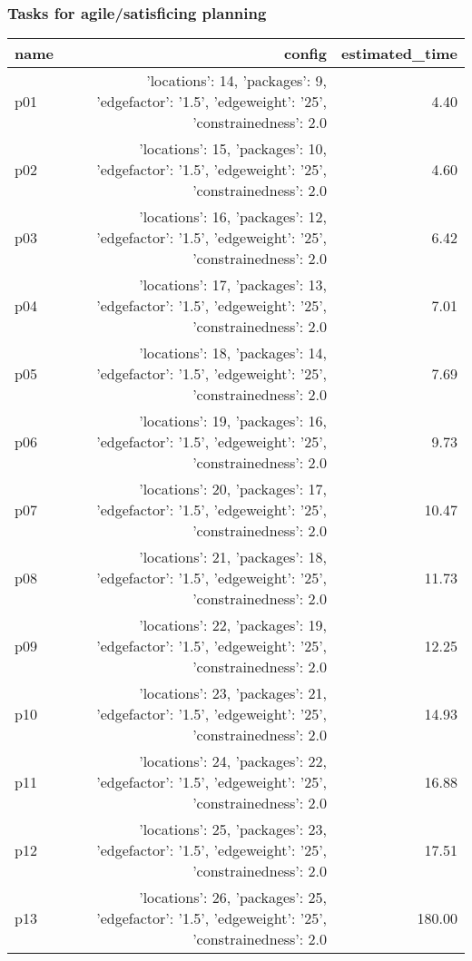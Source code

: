 \documentclass{article}
\begin{document}
                                \subsubsection*{Tasks for agile/satisficing planning}
                                
                            \begin{center}
                            \scriptsize
                            \begin{tabular}{@{}l|r|r@{}}
                            name & config & estimated\_time\\\midrule
                              p01&{'locations': 14, 'packages': 9, 'edgefactor': '1.5', 'edgeweight': '25', 'constrainedness': 2.0}&4.40\\
  p02&{'locations': 15, 'packages': 10, 'edgefactor': '1.5', 'edgeweight': '25', 'constrainedness': 2.0}&4.60\\
  p03&{'locations': 16, 'packages': 12, 'edgefactor': '1.5', 'edgeweight': '25', 'constrainedness': 2.0}&6.42\\
  p04&{'locations': 17, 'packages': 13, 'edgefactor': '1.5', 'edgeweight': '25', 'constrainedness': 2.0}&7.01\\
  p05&{'locations': 18, 'packages': 14, 'edgefactor': '1.5', 'edgeweight': '25', 'constrainedness': 2.0}&7.69\\
  p06&{'locations': 19, 'packages': 16, 'edgefactor': '1.5', 'edgeweight': '25', 'constrainedness': 2.0}&9.73\\
  p07&{'locations': 20, 'packages': 17, 'edgefactor': '1.5', 'edgeweight': '25', 'constrainedness': 2.0}&10.47\\
  p08&{'locations': 21, 'packages': 18, 'edgefactor': '1.5', 'edgeweight': '25', 'constrainedness': 2.0}&11.73\\
  p09&{'locations': 22, 'packages': 19, 'edgefactor': '1.5', 'edgeweight': '25', 'constrainedness': 2.0}&12.25\\
  p10&{'locations': 23, 'packages': 21, 'edgefactor': '1.5', 'edgeweight': '25', 'constrainedness': 2.0}&14.93\\
  p11&{'locations': 24, 'packages': 22, 'edgefactor': '1.5', 'edgeweight': '25', 'constrainedness': 2.0}&16.88\\
  p12&{'locations': 25, 'packages': 23, 'edgefactor': '1.5', 'edgeweight': '25', 'constrainedness': 2.0}&17.51\\
  p13&{'locations': 26, 'packages': 25, 'edgefactor': '1.5', 'edgeweight': '25', 'constrainedness': 2.0}&180.00\\

\end{tabular}
\end{center}
\end{document}
